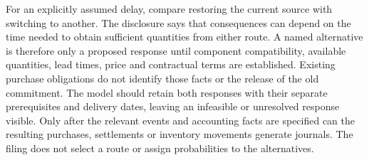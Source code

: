 For an explicitly assumed delay, compare restoring the current source with
switching to another. The disclosure says that consequences can depend on the
time needed to obtain sufficient quantities from either route. A named
alternative is therefore only a proposed response until component
compatibility, available quantities, lead times, price and contractual terms
are established. Existing purchase obligations do not identify those facts or
the release of the old commitment. The model should retain both responses
with their separate prerequisites and delivery dates, leaving an infeasible
or unresolved response visible. Only after the relevant events and accounting
facts are specified can the resulting purchases, settlements or inventory
movements generate journals. The filing does not select a route or assign
probabilities to the alternatives.

